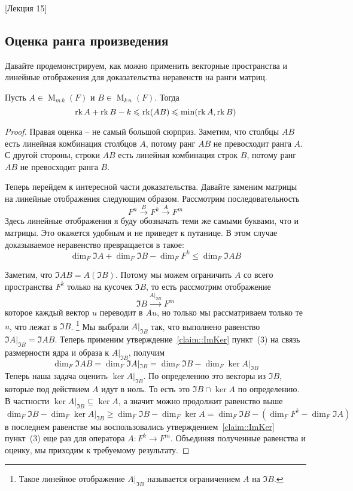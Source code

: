[Лекция 15]


\subsection{Оценка ранга произведения}

Давайте продемонстрируем, как можно применить векторные пространства и линейные отображения для доказательства неравенств на ранги матриц.

\begin{claim}
Пусть $A\in \operatorname{M}_{m\,k}(F)$ и $B\in\operatorname{M}_{k\,n}(F)$.
Тогда
\[
\operatorname{rk} A +\operatorname{rk} B - k \leqslant \operatorname{rk} (AB )\leqslant \min(\operatorname{rk} A, \operatorname{rk} B)
\]
\end{claim}
\begin{proof}
Правая оценка -- не самый большой сюрприз.
Заметим, что столбцы $AB$ есть линейная комбинация столбцов $A$, потому ранг $AB$ не превосходит ранга $A$.
С другой стороны, строки $AB$ есть линейная комбинация строк $B$, потому ранг $AB$ не превосходит ранга $B$.

Теперь перейдем к интересной части доказательства.
Давайте заменим матрицы на линейные отображения следующим образом.
Рассмотрим последовательность 
\[
F^n \stackrel{B}{\longrightarrow} F^k \stackrel{A}{\longrightarrow} F^m
\]
Здесь линейные отображения я буду обозначать теми же самыми буквами, что и матрицы.
Это окажется удобным и не приведет к путанице.
В этом случае доказываемое неравенство превращается в такое:
\[
\dim_F \Im A + \dim_F \Im B - \dim_F F^k \leqslant \dim_F\Im AB
\]

Заметим, что $\Im AB = A(\Im B)$.
Потому мы можем ограничить $A$ со всего пространства $F^k$ только на кусочек $\Im B$, то есть рассмотрим отображение
\[
\Im B \stackrel{A|_{\Im B}}{\longrightarrow} F^m
\]
которое каждый вектор $u$ переводит в $Au$, но только мы рассматриваем только те $u$, что лежат в $\Im B$.%
\footnote{Такое линейное отображение $A|_{\Im B}$ называется ограничением $A$ на $\Im B$.}
Мы выбрали $A|_{\Im B}$ так, что выполнено равенство $\Im A|_{\Im B} = \Im AB$.
Теперь применим утверждение~\ref{claim::ImKer} пункт~(3) на связь размерности ядра и образа к $A|_{\Im B}$, получим
\[
\dim_F \Im AB = \dim_F \Im A|_{\Im B} = \dim_F \Im B - \dim_F \ker A|_{\Im B}
\]
Теперь наша задача оценить $\ker A|_{\Im B}$.
По определению это векторы из $\Im B$, которые под действием $A$ идут в ноль.
То есть это $\Im B \cap \ker A$ по определению.
В частности $\ker A|_{\Im B}\subseteq \ker A$, а значит можно продолжит равенство выше
\[
\dim_F \Im B - \dim_F \ker A|_{\Im B}\geqslant \dim_F \Im B - \dim_F \ker A = \dim_F \Im B - (\dim_F F^k - \dim_F \Im A)
\]
в последнем равенстве мы воспользовались утверждением~\ref{claim::ImKer} пункт~(3) еще раз для оператора $A\colon F^k \to F^m$.
Объединяя полученные равенства и оценку, мы приходим к требуемому результату.
\end{proof}

